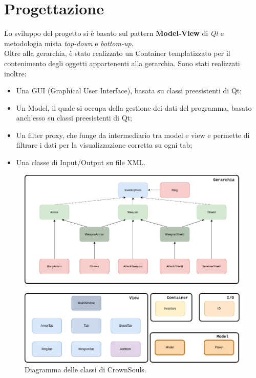 \section{Progettazione}
Lo sviluppo del progetto si è basato sul pattern \textbf{Model-View} di \textit{Qt} e metodologia mista \textit{top-down} e \textit{bottom-up}. \\
Oltre alla gerarchia, è stato realizzato un Container templatizzato per il contenimento degli oggetti appartenenti alla gerarchia.
Sono stati realizzati inoltre:
\begin{itemize}
  \item Una GUI (Graphical User Interface), basata su classi preesistenti di Qt;
  \item Un Model, il quale si occupa della gestione dei dati del programma, basato anch'esso su classi preesistenti di Qt;
  \item Un filter proxy, che funge da intermediario tra model e view e permette di filtrare i dati per la visualizzazione corretta su ogni tab;
  \item Una classe di Input/Output su file XML.
\end{itemize}

\begin{figure}[H]
  \centering
  \includegraphics[width = \linewidth]{img/diagramma}
  \caption{Diagramma delle classi di CrownSouls.}
\end{figure}

